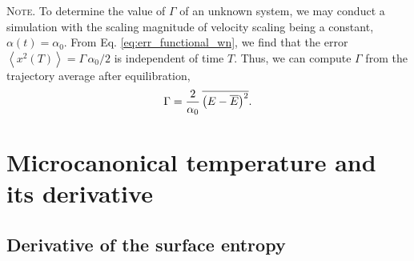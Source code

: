 \documentclass[reprint]{revtex4-1}
\newcommand{\note}[1]{{\color{DarkGreen}\footnotesize \textsc{Note.} #1}}
\begin{document}
\note{
  To determine the value of $\Gamma$ of an unknown system,
  we may conduct a simulation
  with the scaling magnitude of velocity scaling
  being a constant, $\alpha(t) = \alpha_0$.
  From Eq. \eqref{eq:err_functional_wn}, we find that
  the error
  $\left\langle
    x^2(T)
  \right\rangle
  =
  \Gamma \, \alpha_0 / 2$
  is independent of time $T$.
  Thus, we can compute $\Gamma$ from the trajectory average
  after equilibration,
  \begin{equation}
  \Gamma
  =
  \frac{ 2 } { \alpha_0 } \,
  \overline{
    \bigl(
      E - \overline E
    \bigr)^2
  }
  .
  \notag
  \end{equation}
}



\section{\label{sec:microT}
Microcanonical temperature and its derivative}



\subsection{Derivative of the surface entropy}
\end{document}
